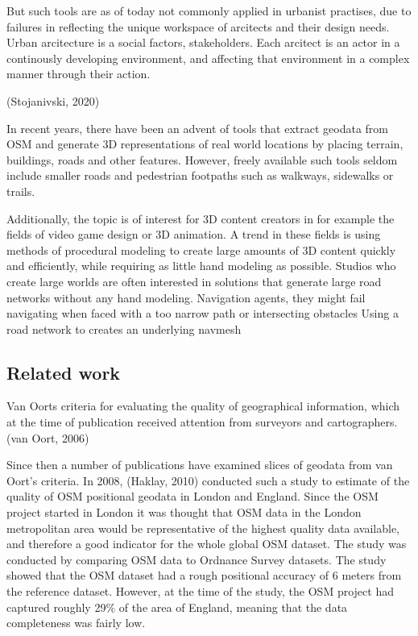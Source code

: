 \documentclass[a4paper]{article}
\begin{document}
But such tools are as of today not commonly applied in urbanist practises, due to failures in reflecting the unique workspace of arcitects and their design needs. Urban arcitecture is a social factors, stakeholders. Each arcitect is an actor in a continously developing environment, and affecting that environment in a complex manner through their action.

(Stojanivski, 2020)

In recent years, there have been an advent of tools that extract geodata from OSM and generate 3D representations of real world locations by placing terrain, buildings, roads and other features.
However, freely available such tools seldom include smaller roads and pedestrian footpaths such as walkways, sidewalks or trails.

Additionally, the topic is of interest for 3D content creators in for example the fields of video game design or 3D animation. A trend in these fields is using methods of procedural modeling to create large amounts of 3D content quickly and efficiently, while requiring as little hand modeling as possible. Studios who create large worlds are often interested in solutions that generate large road networks without any hand modeling.
Navigation agents, they might fail navigating when faced with a too narrow path or intersecting obstacles
Using a road network to creates an underlying navmesh

\subsection{Related work}
Van Oorts criteria for evaluating the quality of geographical information, which at the time of publication received attention from surveyors and cartographers. (van Oort, 2006)

Since then a number of publications have examined slices of geodata from van Oort's criteria. In 2008, (Haklay, 2010) conducted such a study to estimate of the quality of OSM positional geodata in London and England. Since the OSM project started in London it was thought that OSM data in the London metropolitan area would be representative of the highest quality data available, and therefore a good indicator for the whole global OSM dataset. The study was conducted by comparing OSM data to Ordnance Survey datasets. The study showed that the OSM dataset had a rough positional accuracy of 6 meters from the reference dataset. However, at the time of the study, the OSM project had captured roughly 29\% of the area of England, meaning that the data completeness was fairly low.
\end{document}
